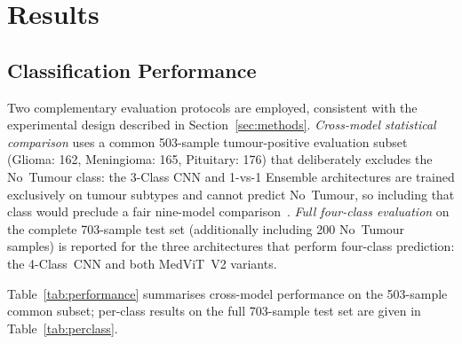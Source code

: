 \section{Results}
\label{sec:results}

\subsection{Classification Performance}
\label{subsec:classification}

Two complementary evaluation protocols are employed, consistent with the
experimental design described in Section~\ref{sec:methods}.
\emph{Cross-model statistical comparison} uses a common 503-sample
tumour-positive evaluation subset (Glioma: 162, Meningioma: 165,
Pituitary: 176) that deliberately excludes the No~Tumour class: the
3-Class CNN and 1-vs-1 Ensemble architectures are trained exclusively on
tumour subtypes and cannot predict No~Tumour, so including that class
would preclude a fair nine-model comparison~\citep{demsar2006}.
\emph{Full four-class evaluation} on the complete 703-sample test set
(additionally including 200 No~Tumour samples) is reported for the three
architectures that perform four-class prediction: the 4-Class~CNN and
both MedViT~V2 variants.

Table~\ref{tab:performance} summarises cross-model performance on the
503-sample common subset; per-class results on the full 703-sample test
set are given in Table~\ref{tab:perclass}.

